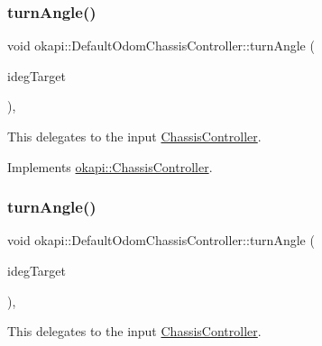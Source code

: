 \mbox{\label{classokapi_1_1DefaultOdomChassisController_a4ba07ac4bea9ff2d8aea30be72f6a0ea}} 
\subsubsection{\texorpdfstring{turnAngle()}{turnAngle()}\hspace{0.1cm}{\footnotesize\ttfamily [1/2]}}
{\footnotesize\ttfamily void okapi\+::\+Default\+Odom\+Chassis\+Controller\+::turn\+Angle (\begin{DoxyParamCaption}\item[{Q\+Angle}]{ideg\+Target }\end{DoxyParamCaption})\hspace{0.3cm}{\ttfamily [override]}, {\ttfamily [virtual]}}

This delegates to the input \mbox{\hyperlink{classokapi_1_1ChassisController}{Chassis\+Controller}}. 

Implements \mbox{\hyperlink{classokapi_1_1ChassisController_aab12308b3fad6793c007d7a33730a3f7}{okapi\+::\+Chassis\+Controller}}.

\mbox{\label{classokapi_1_1DefaultOdomChassisController_a05a8a6684b3afe4f7c2ecbc24699f70d}} 
\subsubsection{\texorpdfstring{turnAngle()}{turnAngle()}\hspace{0.1cm}{\footnotesize\ttfamily [2/2]}}
{\footnotesize\ttfamily void okapi\+::\+Default\+Odom\+Chassis\+Controller\+::turn\+Angle (\begin{DoxyParamCaption}\item[{double}]{ideg\+Target }\end{DoxyParamCaption})\hspace{0.3cm}{\ttfamily [override]}, {\ttfamily [virtual]}}

This delegates to the input \mbox{\hyperlink{classokapi_1_1ChassisController}{Chassis\+Controller}}. 


